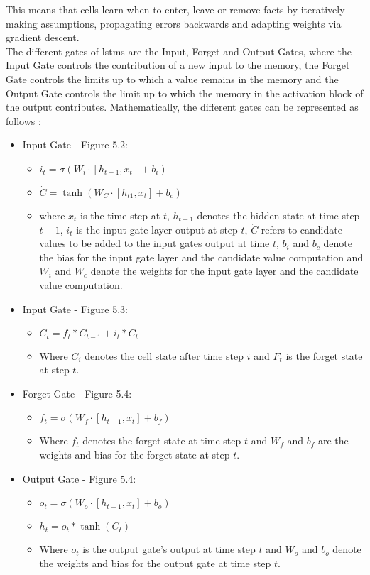 \documentclass[a4paper, 11pt,titlepage,oneside,openany]{book}
\begin{document}
\newpage 
\noindent This means that cells learn when to enter, leave or remove facts by iteratively making assumptions, propagating errors backwards and adapting weights via gradient descent.\\
The different gates of \gls{lstm}s are the Input, Forget and Output Gates, where the Input Gate controls the contribution of a new input to the memory, the Forget Gate controls the limits up to which a value remains in the memory and the Output Gate controls the limit up to which the memory in the activation block of the output contributes. Mathematically, the different gates can be represented as follows \cite{rnn}: 
\begin{itemize}
	\item Input Gate - Figure 5.2: 
	\begin{itemize}
		\item $i_t=\sigma(W_i \cdot [h_{t-1}, x_t]+b_i)$
		\item $\acute{C}=\tanh(W_C \cdot [h_{t1}, x_t]+b_c)$
		\item where $x_t$ is the time step at $t$, $h_{t-1}$ denotes the hidden state at time step $t-1$, $i_t$ is the input gate layer output at step $t$, $\acute{C}$ refers to candidate values to be added to the input gates output at time $t$, $b_i$ and $b_c$ denote the bias for the input gate layer and the candidate value computation and $W_i$ and $W_c$ denote the weights for the input gate layer and the candidate value computation.
	\end{itemize}	
	\item  Input Gate - Figure 5.3:
	\begin{itemize}
		\item $C_t=f_t*C_{t-1}+i_t*C_t$
		\item Where $C_i$ denotes the cell state after time step $i$ and $F_t$ is the forget state at step $t$.
	\end{itemize}
	\item Forget Gate - Figure 5.4:
	\begin{itemize}
		\item $f_t=\sigma(W_f \cdot [h_{t-1}, x_t]+b_f)$
		\item Where $f_t$ denotes the forget state at time step $t$ and $W_f$ and $b_f$ are the weights and bias for the forget state at step $t$.
	\end{itemize}
	\item Output Gate - Figure 5.4:
	\begin{itemize}
		\item $o_t=\sigma(W_o \cdot [h_{t-1},x_t]+b_o)$
		\item $h_t=o_t*\tanh(C_t)$
		\item Where $o_t$ is the output gate's output at time step $t$ and $W_o$ and $b_o$ denote the weights and bias for the output gate at time step $t$.
	\end{itemize}
\end{itemize}
\end{document}
